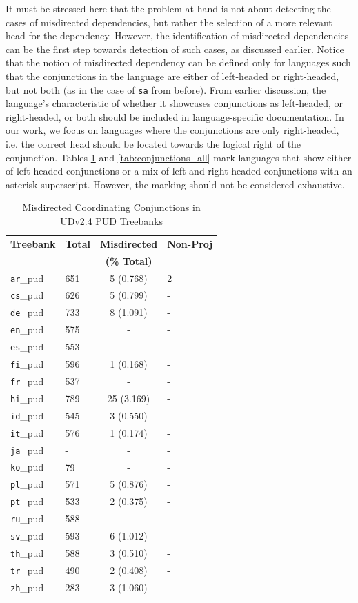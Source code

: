 It must be stressed here that the problem at hand is not about detecting the cases of misdirected dependencies, but rather the selection of a more relevant head for the dependency. However, the identification of misdirected dependencies can be the first step towards detection of such cases, as discussed earlier. Notice that the notion of misdirected dependency can be defined only for languages such that the conjunctions in the language are either of left-headed or right-headed, but not both (as in the case of \verb|sa| from before). From earlier discussion, the language's characteristic of whether it showcases conjunctions as left-headed, or right-headed, or both should be included in language-specific documentation. In our work, we focus on languages where the conjunctions are only right-headed, i.e. the correct head should be located towards the logical right of the conjunction. Tables \ref{tab:conjunctions_pud} and \ref{tab:conjunctions_all} mark languages that show either of left-headed conjunctions or a mix of left and right-headed conjunctions with an asterisk superscript. However, the marking should not be considered exhaustive.

\begin{table}[h]
\centering
\begin{tabular}{|l|l|c|l|}
\hline
\textbf{Treebank} & \textbf{Total} & \textbf{Misdirected} & \textbf{Non-Proj}\\
 & & \textbf{(\% Total)} & \\
\hline
\texttt{ar}\_pud & 651 & 5 (0.768) & 2\\
\texttt{cs}\_pud & 626 & 5 (0.799) & -\\
\texttt{de}\_pud & 733 & 8 (1.091) & -\\
\texttt{en}\_pud & 575 & - & -\\
\texttt{es}\_pud & 553 & - & -\\
\texttt{fi}\_pud & 596 & 1 (0.168) & -\\
\texttt{fr}\_pud & 537 & - & -\\
\texttt{hi}\_pud & 789 & 25 (3.169) & -\\
\texttt{id}\_pud & 545 & 3 (0.550) & -\\
\texttt{it}\_pud & 576 & 1 (0.174) & -\\
\texttt{ja}\_pud & - & - & -\\
\texttt{ko}\_pud & 79 & - & -\\
\texttt{pl}\_pud & 571 & 5 (0.876) & -\\
\texttt{pt}\_pud & 533 & 2 (0.375) & -\\
\texttt{ru}\_pud & 588 & - & -\\
\texttt{sv}\_pud & 593 & 6 (1.012) & -\\
\texttt{th}\_pud & 588 & 3 (0.510) & -\\
\texttt{tr}\_pud & 490 & 2 (0.408) & -\\
\texttt{zh}\_pud & 283 & 3 (1.060) & -\\
\hline
\end{tabular}
\caption{Misdirected Coordinating Conjunctions in UDv2.4 PUD Treebanks}
\label{tab:conjunctions_pud}
\end{table}


